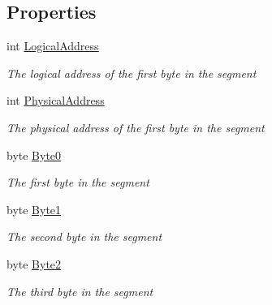 \subsection*{Properties}
\begin{DoxyCompactItemize}
\item 
int \hyperlink{class_c_p_u___o_s___simulator_1_1_memory_1_1_memory_segment_a254cb3b68c5ea35ec44a4df264833bf4}{Logical\+Address}
\begin{DoxyCompactList}\small\item\em The logical address of the first byte in the segment \end{DoxyCompactList}\item 
int \hyperlink{class_c_p_u___o_s___simulator_1_1_memory_1_1_memory_segment_aeb2f540146dfc353f5529bf846e62587}{Physical\+Address}
\begin{DoxyCompactList}\small\item\em The physical address of the first byte in the segment \end{DoxyCompactList}\item 
byte \hyperlink{class_c_p_u___o_s___simulator_1_1_memory_1_1_memory_segment_af1355b8170ad0461d479785ff6e1420d}{Byte0}
\begin{DoxyCompactList}\small\item\em The first byte in the segment \end{DoxyCompactList}\item 
byte \hyperlink{class_c_p_u___o_s___simulator_1_1_memory_1_1_memory_segment_aba977f51dac4aeaa069fc14f877c7367}{Byte1}
\begin{DoxyCompactList}\small\item\em The second byte in the segment \end{DoxyCompactList}\item 
byte \hyperlink{class_c_p_u___o_s___simulator_1_1_memory_1_1_memory_segment_af33632597b874fbb501068a9285f5ad6}{Byte2}
\begin{DoxyCompactList}\small\item\em The third byte in the segment \end{DoxyCompactList}\item 

\end{DoxyCompactItemize}
